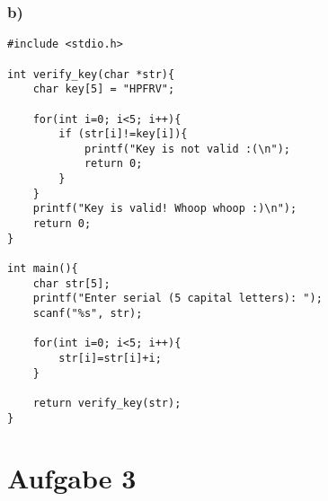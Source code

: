 \documentclass[]{scrreprt}
\begin{document}
\subsection*{b)}
\begin{lstlisting}
#include <stdio.h>

int verify_key(char *str){
	char key[5] = "HPFRV";

	for(int i=0; i<5; i++){
		if (str[i]!=key[i]){
			printf("Key is not valid :(\n");
			return 0;
		}
	}
	printf("Key is valid! Whoop whoop :)\n");
	return 0;
}
	
int main(){
	char str[5];
	printf("Enter serial (5 capital letters): ");
	scanf("%s", str);
	
	for(int i=0; i<5; i++){
		str[i]=str[i]+i;
	}

	return verify_key(str);
}
\end{lstlisting}
\chapter{Aufgabe 3}
\end{document}
